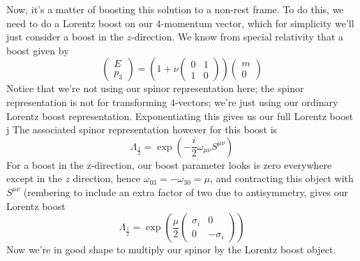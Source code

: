 \documentclass[11pt, oneside]{article}   	%
\theoremstyle{newline}
\theoremstyle{newline}
\theoremstyle{newline}
\theoremstyle{newline}
\theoremstyle{newline}
\begin{document}
Now, it's a matter of boosting this solution to a non-rest frame. To do this, we need to do a Lorentz boost on our 4-momentum vector, which for simplicity we'll just consider a boost in the $z$-direction. We know from special relativity that a boost given by 
\[ 
\begin{pmatrix} 
E \\ p_3 
\end{pmatrix}  = \left(  1 + \nu \begin{pmatrix} 0 & 1 \\ 1 & 0 \end{pmatrix} \right)  \begin{pmatrix} m \\ 0 \end{pmatrix} \] 
Notice that we're not using our spinor representation here; the spinor representation is not for transforming 4-vectors; we're just using our ordinary Lorentz boost representation. Exponentiating this gives us our full Lorentz boost j The associated spinor representation however for this boost is 
\[
\Lambda_{\frac{1}{2}} = \exp \left(  - \frac{i}{2} \omega_{ \mu \nu } S^{\mu \nu} \right) 
\]
For a boost in the z-direction, our boost parameter looks is zero everywhere except in the $z$ direction, hence $\omega_{03}  = - \omega_{30}  = \mu$, and contracting this object with $S^{ \mu \nu} $ (rembering to include an extra factor of two due to antisymmetry, gives our Lorentz boost \[ 
\Lambda_{\frac{1}{ 2}} = \exp \left(  \frac{ \mu}{ 2} \begin{pmatrix} \sigma_i & 0 \\ 0 &  -\sigma_i \end{pmatrix} \right)  \] 
Now we're in good shape to multiply our spinor by the Lorentz boost object.  
\end{document}
